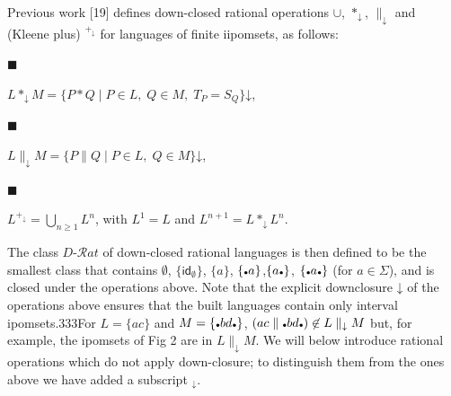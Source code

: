  
 
Previous work [19] defines down-closed rational operations $\cup$, $*_{\mathord{\downarrow}}$, $\|_{\mathord{\downarrow}}$ and (Kleene plus) ${}^{+_{\mathord{\downarrow}}}$ for languages of finite iipomsets, as follows:\par
  
\par\noindent  $\blacksquare$ 
 
$L*_{\mathord{\downarrow}}M=\{P*Q\mid P\in L,\;Q\in M,\;T_{P}=S_{Q}\}\mathord{\downarrow}$,\par
 
 
 
\par\noindent  $\blacksquare$ 
 
$L\parallel_{\mathord{\downarrow}}M=\{P\parallel Q\mid P\in L,\;Q\in M\}\mathord{\downarrow}$,\par
 
 
 
\par\noindent  $\blacksquare$ 
 
$L^{+_{\mathord{\downarrow}}}=\bigcup\nolimits_{n\geq 1}L^{n}$, with $L^{1}=L$ and $L^{n+1}=L*_{\mathord{\downarrow}}L^{n}$.\par
 
 
  
The class $D\text{-}\mathcal{R}at$ of down-closed rational languages is then defined to be the smallest class that contains $\emptyset$, ${\{\mathsf{id}_{\emptyset}\}}$, ${\{a\}}$, ${\{\vbox{\hbox{\tiny$\bullet$}}a\}}$,${\{a\vbox{\hbox{\tiny$\bullet$}}\}}$, ${\{\vbox{\hbox{\tiny$\bullet$}}a\vbox{\hbox{\tiny$\bullet$}}\}}$ (for $a\in\Sigma$), and is closed under the operations above. Note that the explicit downclosure $\mathord{\downarrow}$ of the operations above ensures that the built languages contain only interval ipomsets.333For $L={\{ac\}}$ and $M={\{\vbox{\hbox{\tiny$\bullet$}}bd\vbox{\hbox{\tiny$\bullet$}}\}}$, $(ac\parallel\vbox{\hbox{\tiny$\bullet$}}bd\vbox{\hbox{\tiny$\bullet$}})\not\in
L\parallel_{\mathord{\downarrow}}M$ but, for example, the ipomsets of Fig 2 are in $L\parallel_{\mathord{\downarrow}}M$.  We will below introduce rational operations which do not apply down-closure; to distinguish them from the ones above we have added a subscript ${}_{\mathord{\downarrow}}$.\par
 
